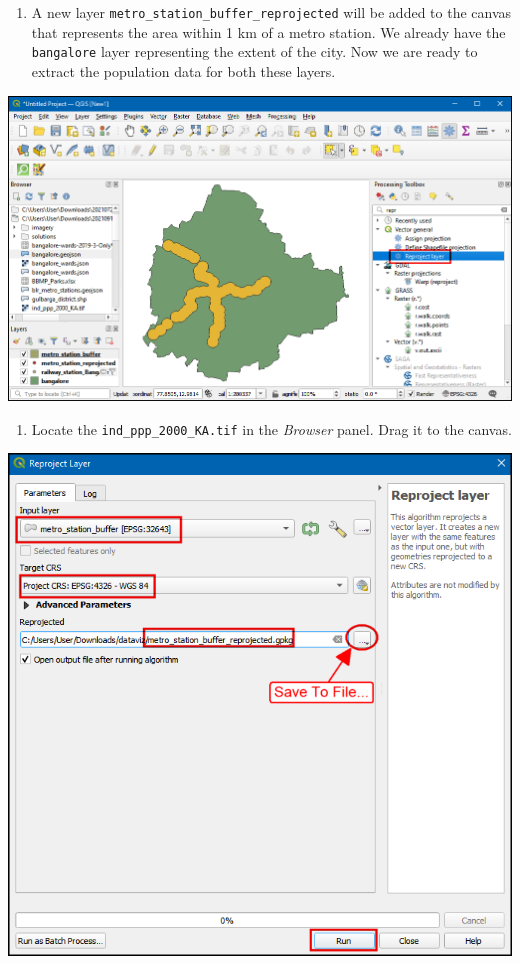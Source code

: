 \documentclass[
  12pt,
  a4paper]{article}
\providecommand{\tightlist}{%
  \setlength{\itemsep}{0pt}\setlength{\parskip}{0pt}}
\begin{document}
\begin{enumerate}
\def\labelenumi{\arabic{enumi}.}
\setcounter{enumi}{10}
\tightlist
\item
  A new layer \texttt{metro\_station\_buffer\_reprojected} will be added
  to the canvas that represents the area within 1 km of a metro station.
  We already have the \texttt{bangalore} layer representing the extent
  of the city. Now we are ready to extract the population data for both
  these layers.
\end{enumerate}

\begin{center}\includegraphics[width=0.75\linewidth]{images/spatial_data_viz/pop11} \end{center}

\begin{enumerate}
\def\labelenumi{\arabic{enumi}.}
\setcounter{enumi}{11}
\tightlist
\item
  Locate the \texttt{ind\_ppp\_2000\_KA.tif} in the \emph{Browser}
  panel. Drag it to the canvas.
\end{enumerate}

\begin{center}\includegraphics[width=0.75\linewidth]{images/spatial_data_viz/pop12} \end{center}
\end{document}
